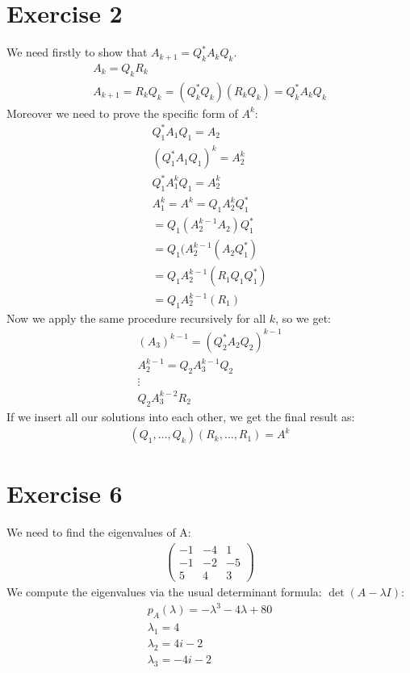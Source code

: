 \section{Exercise 2}
We need firstly to show that $A_{k+1} = Q^*_k A_k Q_k$.
\begin{gather*}
A_k = Q_kR_k\\
A_{k+1} = R_kQ_k = ( Q_k^* Q_k ) (R_k Q_k) = Q^*_k A_k Q_k
\end{gather*}
Moreover we need to prove the specific form of $A^k$:
\begin{gather*}
Q_1^* A_1 Q_1 = A_2\\
(Q_1^* A_1 Q_1 ) ^k = A_2^k\\
Q_1^* A_1^k Q_1 = A_2^k\\
A_1^k = A^k = Q_1 A_2^k Q_1^*\\
= Q_1 ( A_2^{k-1} A_2 ) Q_1^*\\
= Q_1 ( A_2^{k-1} (A_2 Q_1^*)\\
= Q_1 A_2^{k-1} ( R_1 Q_1 Q_1^*)\\
= Q_1 A_2^{k-1} ( R_1)
\end{gather*}
Now we apply the same procedure recursively for all $k$, so we get:
\begin{gather*}
(A_3)^{k-1} = (Q_2^* A_2 Q_2 )^{k-1}\\
A_2^{k-1} = Q_2 A_3^{k-1} Q_2 \\
\vdots \\
Q_2 A_3^{k-2} R_2
\end{gather*}
If we insert all our solutions into each other, we get the final result as:
\begin{gather*}
(Q_1, \ldots ,Q_k) (R_k , \ldots ,R_1 ) =  A^k
\end{gather*}
\section{Exercise 6}
We need to find the eigenvalues of A:
\begin{gather*}
\left( \begin{array}{ccc}
-1 & -4 & 1 \\
-1 & -2 & -5 \\
5 & 4 & 3 
\end{array} \right)
\end{gather*}
We compute the eigenvalues via the usual determinant formula: $\det( A - \lambda I )$:
\begin{gather*}
p_A(\lambda) = -\lambda^3 - 4 \lambda + 80 \\
\lambda_1 = 4\\
\lambda_2 = 4i -2\\
\lambda_3 = -4i-2
\end{gather*}

